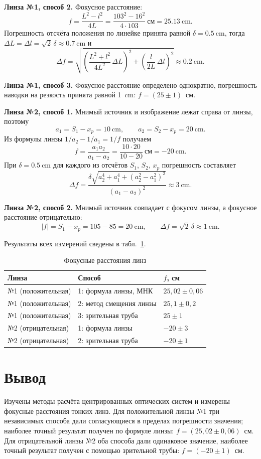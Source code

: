 \documentclass[14pt,a4paper]{extarticle}
\begin{document}
\textbf{Линза №1, способ 2.} Фокусное расстояние:
\[
f = \frac{L^2 - l^2}{4L} = \frac{103^2 - 16^2}{4 \cdot 103}~\text{см} = \SI{25,13}{\cm}.
\]
Погрешность отсчёта положения по линейке принята равной $\delta = \SI{0,5}{\cm}$, тогда $\Delta L = \Delta l = \sqrt{2}\,\delta \approx \SI{0,7}{\cm}$ и
\[
\Delta f = \sqrt{\left(\frac{L^2 + l^2}{4L^2}\,\Delta L\right)^2 + \left(\frac{l}{2L}\,\Delta l\right)^2} \approx \SI{0,2}{\cm}.
\]

\textbf{Линза №1, способ 3.} Фокусное расстояние определено однократно, погрешность наводки на резкость принята равной \SI{1}{\cm}: $f = (25 \pm 1)$~см.

\textbf{Линза №2, способ 1.} Мнимый источник и изображение лежат справа от линзы, поэтому
\[
a_1 = S_1 - x_p = \SI{10}{\cm},
\qquad
a_2 = S_2 - x_p = \SI{20}{\cm}.
\]
Из формулы линзы $1/a_2 - 1/a_1 = 1/f$ получаем
\[
f = \frac{a_1 a_2}{a_1 - a_2} = \frac{10 \cdot 20}{10 - 20}~\text{см} = \SI{-20}{\cm}.
\]
При $\delta = \SI{0,5}{\cm}$ для каждого из отсчётов $S_1$, $S_2$, $x_p$ погрешность составляет
\[
\Delta f = \frac{\delta\sqrt{a_2^4 + a_1^4 + \left(a_2^2 - a_1^2\right)^2}}{\left(a_1 - a_2\right)^2} \approx \SI{3}{\cm}.
\]

\textbf{Линза №2, способ 2.} Мнимый источник совпадает с фокусом линзы, а фокусное расстояние отрицательно:
\[
|f| = S_1 - x_p = 105 - 85 = \SI{20}{\cm},
\qquad
\Delta f = \sqrt{2}\,\delta \approx \SI{1}{\cm}.
\]

Результаты всех измерений сведены в табл.~\ref{tab:results}.

\begin{table}[htbp]
\caption{Фокусные расстояния линз}
\label{tab:results}
\centering
\begin{tabular}{lll}
\toprule
Линза & Способ & $f$, см \\
\midrule
№1 (положительная) & 1: формула линзы, МНК & $25{,}02 \pm 0{,}06$ \\
№1 (положительная) & 2: метод смещения линзы & $25{,}1 \pm 0{,}2$ \\
№1 (положительная) & 3: зрительная труба & $25 \pm 1$ \\
№2 (отрицательная) & 1: формула линзы & $-20 \pm 3$ \\
№2 (отрицательная) & 2: зрительная труба & $-20 \pm 1$ \\
\bottomrule
\end{tabular}
\end{table}

\section*{Вывод}

Изучены методы расчёта центрированных оптических систем и измерены фокусные расстояния тонких линз. Для положительной линзы №1 три независимых способа дали согласующиеся в пределах погрешности значения; наиболее точный результат получен по формуле линзы: $f = (25{,}02 \pm 0{,}06)$~см. Для отрицательной линзы №2 оба способа дали одинаковое значение, наиболее точный результат получен с помощью зрительной трубы: $f = (-20 \pm 1)$~см.
\end{document}
